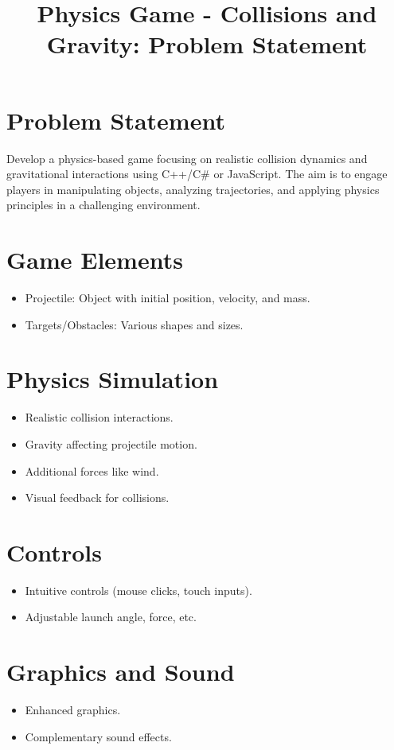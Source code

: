 \documentclass{article}
\title{Physics Game - Collisions and Gravity: Problem Statement}
\author{} %
\date{} %
\begin{document}
\maketitle

\section{Problem Statement}
Develop a physics-based game focusing on realistic collision dynamics and gravitational interactions using C++/C\# or JavaScript. The aim is to engage players in manipulating objects, analyzing trajectories, and applying physics principles in a challenging environment.

\section{Game Elements}
\begin{itemize}
  \item Projectile: Object with initial position, velocity, and mass.
  \item Targets/Obstacles: Various shapes and sizes.
\end{itemize}

\section{Physics Simulation}
\begin{itemize}
  \item Realistic collision interactions.
  \item Gravity affecting projectile motion.
  \item Additional forces like wind.
  \item Visual feedback for collisions.
\end{itemize}

\section{Controls}
\begin{itemize}
  \item Intuitive controls (mouse clicks, touch inputs).
  \item Adjustable launch angle, force, etc.
\end{itemize}

\section{Graphics and Sound}
\begin{itemize}
  \item Enhanced graphics.
  \item Complementary sound effects.
\end{itemize}
\end{document}
